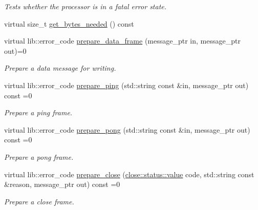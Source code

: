 \begin{DoxyCompactItemize}
\begin{DoxyCompactList}\small\item\em Tests whether the processor is in a fatal error state. \end{DoxyCompactList}\item 
virtual size\+\_\+t \hyperlink{classwebsocketpp_1_1processor_1_1processor_a141bc4565dc27e047df1251f117543b4}{get\+\_\+bytes\+\_\+needed} () const
\item 
virtual lib\+::error\+\_\+code \hyperlink{classwebsocketpp_1_1processor_1_1processor_a1345763249867d742390aa8e2076cb70}{prepare\+\_\+data\+\_\+frame} (message\+\_\+ptr in, message\+\_\+ptr out)=0
\begin{DoxyCompactList}\small\item\em Prepare a data message for writing. \end{DoxyCompactList}\item 
virtual lib\+::error\+\_\+code \hyperlink{classwebsocketpp_1_1processor_1_1processor_aae3f34ae169c9b5e588cf268e310d6e2}{prepare\+\_\+ping} (std\+::string const \&in, message\+\_\+ptr out) const =0
\begin{DoxyCompactList}\small\item\em Prepare a ping frame. \end{DoxyCompactList}\item 
virtual lib\+::error\+\_\+code \hyperlink{classwebsocketpp_1_1processor_1_1processor_afc8206bfe447a461d0e30a969b0af859}{prepare\+\_\+pong} (std\+::string const \&in, message\+\_\+ptr out) const =0
\begin{DoxyCompactList}\small\item\em Prepare a pong frame. \end{DoxyCompactList}\item 
virtual lib\+::error\+\_\+code \hyperlink{classwebsocketpp_1_1processor_1_1processor_a189c400df6f5e325291794cb62053911}{prepare\+\_\+close} (\hyperlink{namespacewebsocketpp_1_1close_1_1status_a8614a5c4733d708e2d2a32191c5bef84}{close\+::status\+::value} code, std\+::string const \&reason, message\+\_\+ptr out) const =0
\begin{DoxyCompactList}\small\item\em Prepare a close frame. \end{DoxyCompactList}\end{DoxyCompactItemize}
